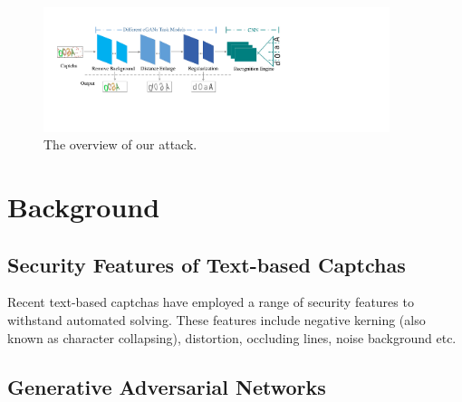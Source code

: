 \begin{figure}[!t]
  \centering
  \includegraphics[width=0.9\textwidth]{fig/overview/overview.pdf}
  \caption{The overview of our attack.}
  \label{fig:overview}
\end{figure}

\section{Background}
\subsection{Security Features of Text-based Captchas}
Recent text-based captchas have employed a range of security features to withstand automated solving. These features include negative
kerning (also known as character collapsing), distortion, occluding lines, noise background etc.


\subsection{Generative Adversarial Networks}


